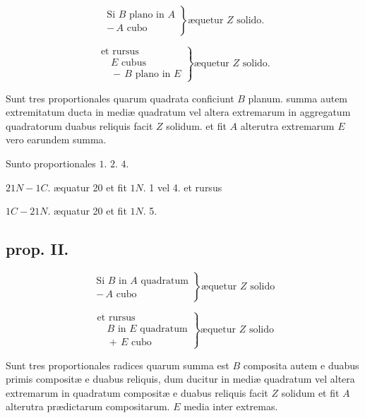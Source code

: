\documentclass[11pt,a4paper]{article}
\begin{document}
\[ \left. \begin{array}{l} \text{Si } B \text{ plano in } A \\ -\,A \text{ cubo} \end{array} \right\} \text{æquetur } Z \text{ solido.} \]

\[ \left. \begin{array}{l} \text{et rursus} \\ \quad E \text{ cubus} \\ \quad -\,B \text{ plano in } E \end{array} \right\} \text{æquetur } Z \text{ solido.} \]

Sunt tres proportionales quarum quadrata  conficiunt $B$ planum. summa autem extremitatum ducta in mediæ quadratum vel altera extremarum in aggregatum quadratorum  duabus reliquis facit $Z$ solidum. et fit $A$ alterutra extremarum $E$ vero earundem summa.

Sunto proportionales $1$. $2$. $4$.

$21N - 1C$. æquatur 20 et fit $1N$. 1 vel 4. et rursus

$1C - 21N$. æquatur 20 et fit $1N$. 5.

\subsection*{prop. II.}

\[ \left. \begin{array}{l} \text{Si } B \text{ in } A \text{ quadratum} \\ -\,A \text{ cubo} \end{array} \right\} \text{æquetur } Z \text{ solido} \]

\[ \left. \begin{array}{l} \text{et rursus} \\ \quad B \text{ in } E \text{ quadratum} \\ \quad +\,E \text{ cubo} \end{array} \right\} \text{æquetur } Z \text{ solido} \]

Sunt tres proportionales radices quarum summa est $B$ composita autem e duabus primis  compositæ e duabus reliquis, dum ducitur in mediæ quadratum vel altera extremarum in quadratum compositæ e duabus reliquis facit $Z$ solidum et fit $A$ alterutra prædictarum compositarum. $E$ media inter extremas.
\end{document}
